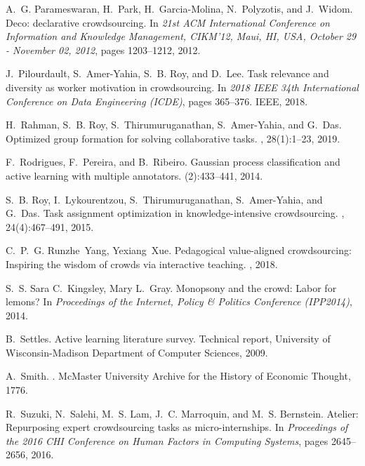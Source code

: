 \documentclass[11pt]{article}
\begin{document}
\begin{thebibliography}{10}
	A.~G. Parameswaran, H.~Park, H.~Garcia{-}Molina, N.~Polyzotis, and J.~Widom.
	\newblock Deco: declarative crowdsourcing.
	\newblock In {\em 21st {ACM} International Conference on Information and
		Knowledge Management, CIKM'12, Maui, HI, USA, October 29 - November 02,
		2012}, pages 1203--1212, 2012.
	
	J.~Pilourdault, S.~Amer-Yahia, S.~B. Roy, and D.~Lee.
	\newblock Task relevance and diversity as worker motivation in crowdsourcing.
	\newblock In {\em 2018 IEEE 34th International Conference on Data Engineering
		(ICDE)}, pages 365--376. IEEE, 2018.
	
	H.~Rahman, S.~B. Roy, S.~Thirumuruganathan, S.~Amer-Yahia, and G.~Das.
	\newblock Optimized group formation for solving collaborative tasks.
	, 28(1):1--23, 2019.
	
	F.~Rodrigues, F.~Pereira, and B.~Ribeiro.
	\newblock Gaussian process classification and active learning with multiple
	annotators.
	(2):433--441, 2014.
	
	S.~B. Roy, I.~Lykourentzou, S.~Thirumuruganathan, S.~Amer{-}Yahia, and G.~Das.
	\newblock Task assignment optimization in knowledge-intensive crowdsourcing.
	, 24(4):467--491, 2015.
	
	C.~P.~G. Runzhe~Yang, Yexiang~Xue.
	\newblock Pedagogical value-aligned crowdsourcing: Inspiring the wisdom of
	crowds via interactive teaching.
	, 2018.
	
	S.~S. Sara C.~Kingsley, Mary L.~Gray.
	\newblock Monopsony and the crowd: Labor for lemons?
	\newblock In {\em Proceedings of the Internet, Policy \& Politics Conference
		(IPP2014)}, 2014.
	
	B.~Settles.
	\newblock Active learning literature survey.
	\newblock Technical report, University of Wisconsin-Madison Department of
	Computer Sciences, 2009.
	
	A.~Smith.
	.
	\newblock McMaster University Archive for the History of Economic Thought,
	1776.
	
	R.~Suzuki, N.~Salehi, M.~S. Lam, J.~C. Marroquin, and M.~S. Bernstein.
	\newblock Atelier: Repurposing expert crowdsourcing tasks as micro-internships.
	\newblock In {\em Proceedings of the 2016 CHI Conference on Human Factors in
		Computing Systems}, pages 2645--2656, 2016.
	

\end{thebibliography}
\end{document}
